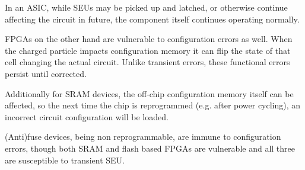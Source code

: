 \documentclass[12pt,final,oneside]{dwThesis} %
\begin{document}
%
In an \ac{ASIC}, while \acp{SEU} may be picked up and latched, or otherwise continue affecting the circuit in future, the component itself continues operating normally.

\acp{FPGA} on the other hand are vulnerable to configuration errors as well. When the charged particle impacts configuration memory it can flip the state of that cell changing the actual circuit. Unlike transient errors, these functional errors persist until corrected.

Additionally for \ac{SRAM} devices, the off-chip configuration memory itself can be affected, so the next time the chip is reprogrammed (e.g. after power cycling), an incorrect circuit configuration will be loaded.

(Anti)fuse devices, being non reprogrammable, are immune to configuration errors, though both \ac{SRAM} and flash based \acp{FPGA} are vulnerable and all three are susceptible to transient \ac{SEU}\cite{HFPP}.
\end{document}
